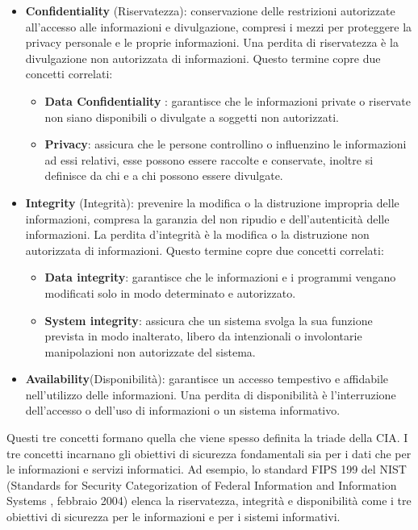\begin{itemize}
      \item \textbf{Confidentiality} (Riservatezza):  conservazione delle restrizioni autorizzate all'accesso alle informazioni e divulgazione, compresi i mezzi per proteggere la privacy personale e le proprie informazioni. Una perdita di riservatezza è la divulgazione non autorizzata di informazioni. Questo termine copre due concetti correlati:
            \begin{itemize}
                  \item  \textbf{Data Confidentiality} : garantisce che le informazioni private o riservate non siano disponibili o divulgate a soggetti non autorizzati.
                  \item \textbf{Privacy}: assicura che le persone controllino o influenzino le informazioni
                        ad essi relativi, esse possono essere raccolte e conservate, inoltre si definisce da chi e a chi possono essere divulgate.
            \end{itemize}
      \item \textbf{Integrity} (Integrità): prevenire la modifica o la distruzione impropria delle informazioni, compresa la garanzia del non ripudio e dell'autenticità delle informazioni.
            La perdita d'integrità è la modifica o la distruzione non autorizzata di informazioni. Questo termine copre due concetti correlati:
            \begin{itemize}
                  \item \textbf{Data integrity}:  garantisce che le informazioni e i programmi vengano modificati solo in modo determinato e autorizzato.
                  \item \textbf{System integrity}: assicura che un sistema svolga la sua funzione prevista in modo inalterato, libero da intenzionali o involontarie manipolazioni non autorizzate del sistema.
            \end{itemize}
      \item \textbf{Availability}(Disponibilità): garantisce un accesso tempestivo e affidabile nell'utilizzo delle informazioni. Una perdita di disponibilità è l'interruzione dell'accesso o dell'uso di informazioni o un sistema informativo.
\end{itemize}

Questi tre concetti formano quella che viene spesso definita la triade della CIA. I tre
concetti incarnano gli obiettivi di sicurezza fondamentali sia per i dati che per le informazioni
e servizi informatici. Ad esempio, lo standard FIPS 199 del NIST (Standards for Security
Categorization of Federal Information and Information Systems , febbraio 2004) elenca la riservatezza, integrità e disponibilità come i tre obiettivi di sicurezza per le informazioni e
per i sistemi informativi.

